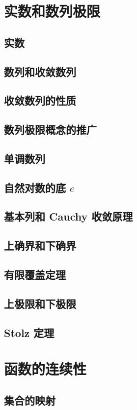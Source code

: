 \documentclass[a4paper, 11pt]{ctexbook}
\begin{document}
    \chapter{实数和数列极限}
        \section{实数}
        \section{数列和收敛数列}
        \section{收敛数列的性质}
        \section{数列极限概念的推广}
        \section{单调数列}
        \section{自然对数的底 $e$}
        \section{基本列和 Cauchy 收敛原理}
        \section{上确界和下确界}
        \section{有限覆盖定理}
        \section{上极限和下极限}
        \section{Stolz 定理}
    \chapter{函数的连续性}
        \section{集合的映射}
\end{document}
